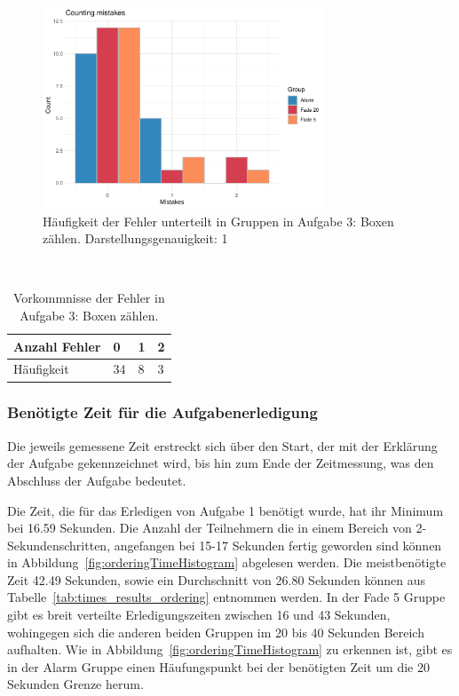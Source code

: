 \begin{figure}[H]
	\centering
	\includegraphics[width=0.75\textwidth]{./_StudyResults/countingMisHist}
	\caption{Häufigkeit der Fehler unterteilt in Gruppen in Aufgabe 3: Boxen zählen. Darstellungsgenauigkeit: 1}
	\label{fig:countingMistakeHistogram}
\end{figure}

\begin{table}
	\caption{Vorkommnisse der Fehler in Aufgabe 3: Boxen zählen.}~\label{tab:countingMistakeNumbers}
	
	\setlength\tabcolsep{3pt}
	\renewcommand{\arraystretch}{1.4}%
	\begin{tabularx}{\textwidth}{ | l | x | x | x | }
		\hline
		Anzahl Fehler & 0   & 1  & 2 \\ \hline\hline
		Häufigkeit 	  & 34  & 8  & 3 \\ \hline
	\end{tabularx}
\end{table}

\subsubsection{Benötigte Zeit für die Aufgabenerledigung}

Die jeweils gemessene Zeit erstreckt sich über den Start, der mit der Erklärung der Aufgabe gekennzeichnet wird, bis hin zum Ende der Zeitmessung, was den Abschluss der Aufgabe bedeutet.

Die Zeit, die für das Erledigen von Aufgabe 1 benötigt wurde, hat ihr Minimum bei 16.59 Sekunden. Die Anzahl der Teilnehmern die in einem Bereich von 2-Sekundenschritten, angefangen bei 15-17 Sekunden fertig geworden sind können in Abbildung~\ref{fig:orderingTimeHistogram} abgelesen werden. Die meistbenötigte Zeit 42.49 Sekunden, sowie ein Durchschnitt von 26.80 Sekunden können aus Tabelle~\ref{tab:times_results_ordering} entnommen werden.
In der Fade 5 Gruppe gibt es breit verteilte Erledigungszeiten zwischen 16 und 43 Sekunden, wohingegen sich die anderen beiden Gruppen im 20 bis 40 Sekunden Bereich aufhalten. Wie in Abbildung~\ref{fig:orderingTimeHistogram} zu erkennen ist, gibt es in der Alarm Gruppe einen Häufungspunkt bei der benötigten Zeit um die 20 Sekunden Grenze herum.

